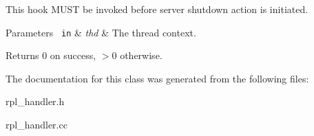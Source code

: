 This hook M\+U\+ST be invoked before server shutdown action is initiated.


\begin{DoxyParams}[1]{Parameters}
\mbox{\texttt{ in}}  & {\em thd} & The thread context. \\
\hline
\end{DoxyParams}
\begin{DoxyReturn}{Returns}
0 on success, $>$0 otherwise. 
\end{DoxyReturn}


The documentation for this class was generated from the following files\+:\begin{DoxyCompactItemize}
\item 
rpl\+\_\+handler.\+h\item 
rpl\+\_\+handler.\+cc\end{DoxyCompactItemize}
